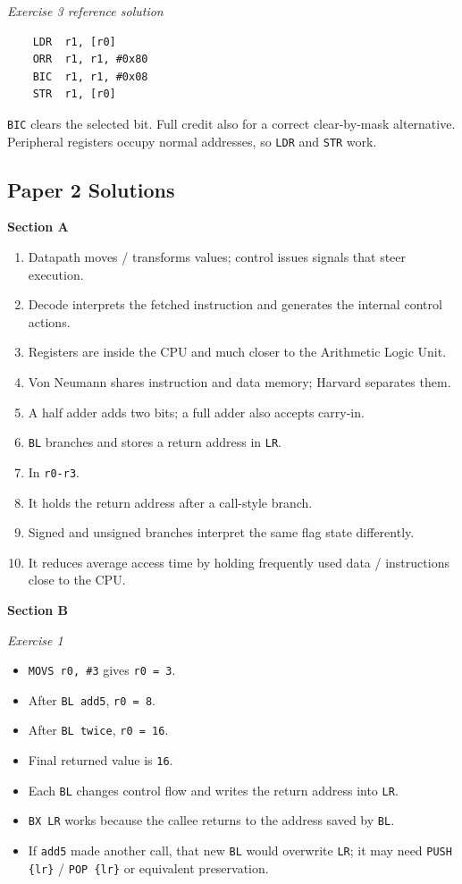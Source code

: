 \documentclass[11pt,a4paper]{article}
\begin{document}
\textit{Exercise 3 reference solution}
\begin{verbatim}
    LDR  r1, [r0]
    ORR  r1, r1, #0x80
    BIC  r1, r1, #0x08
    STR  r1, [r0]
\end{verbatim}
\texttt{BIC} clears the selected bit. Full credit also for a correct clear-by-mask alternative. Peripheral registers occupy normal addresses, so \texttt{LDR} and \texttt{STR} work.

\subsection*{Paper 2 Solutions}
\textbf{Section A}
\begin{enumerate}
\item Datapath moves / transforms values; control issues signals that steer execution.
\item Decode interprets the fetched instruction and generates the internal control actions.
\item Registers are inside the CPU and much closer to the Arithmetic Logic Unit.
\item Von Neumann shares instruction and data memory; Harvard separates them.
\item A half adder adds two bits; a full adder also accepts carry-in.
\item \texttt{BL} branches and stores a return address in \texttt{LR}.
\item In \texttt{r0-r3}.
\item It holds the return address after a call-style branch.
\item Signed and unsigned branches interpret the same flag state differently.
\item It reduces average access time by holding frequently used data / instructions close to the CPU.
\end{enumerate}

\textbf{Section B}

\textit{Exercise 1}
\begin{itemize}[leftmargin=1.5em]
\item \texttt{MOVS r0, \#3} gives \texttt{r0 = 3}.
\item After \texttt{BL add5}, \texttt{r0 = 8}.
\item After \texttt{BL twice}, \texttt{r0 = 16}.
\item Final returned value is \texttt{16}.
\item Each \texttt{BL} changes control flow and writes the return address into \texttt{LR}.
\item \texttt{BX LR} works because the callee returns to the address saved by \texttt{BL}.
\item If \texttt{add5} made another call, that new \texttt{BL} would overwrite \texttt{LR}; it may need \texttt{PUSH \{lr\}} / \texttt{POP \{lr\}} or equivalent preservation.
\end{itemize}
\end{document}
